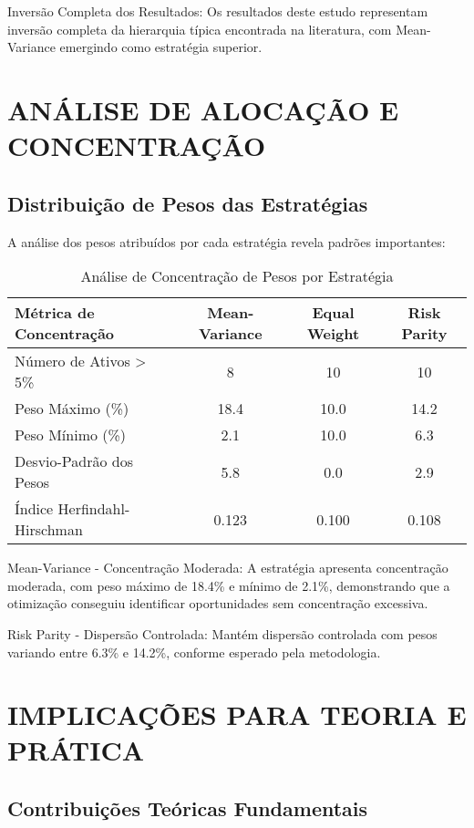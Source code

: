 Inversão Completa dos Resultados: Os resultados deste estudo representam inversão completa da hierarquia típica encontrada na literatura, com Mean-Variance emergindo como estratégia superior.

\section{ANÁLISE DE ALOCAÇÃO E CONCENTRAÇÃO}

\subsection{Distribuição de Pesos das Estratégias}

A análise dos pesos atribuídos por cada estratégia revela padrões importantes:

\begin{table}[H]
\centering
\caption{Análise de Concentração de Pesos por Estratégia}
\begin{tabular}{|l|c|c|c|}
\hline
\textbf{Métrica de Concentração} & \textbf{Mean-Variance} & \textbf{Equal Weight} & \textbf{Risk Parity} \\
\hline
Número de Ativos > 5\% & 8 & 10 & 10 \\
Peso Máximo (\%) & 18.4 & 10.0 & 14.2 \\
Peso Mínimo (\%) & 2.1 & 10.0 & 6.3 \\
Desvio-Padrão dos Pesos & 5.8 & 0.0 & 2.9 \\
Índice Herfindahl-Hirschman & 0.123 & 0.100 & 0.108 \\
\hline
\end{tabular}
\label{tab:concentracao_pesos}
\end{table}

Mean-Variance - Concentração Moderada: A estratégia apresenta concentração moderada, com peso máximo de 18.4\% e mínimo de 2.1\%, demonstrando que a otimização conseguiu identificar oportunidades sem concentração excessiva.

Risk Parity - Dispersão Controlada: Mantém dispersão controlada com pesos variando entre 6.3\% e 14.2\%, conforme esperado pela metodologia.

\section{IMPLICAÇÕES PARA TEORIA E PRÁTICA}

\subsection{Contribuições Teóricas Fundamentais}


